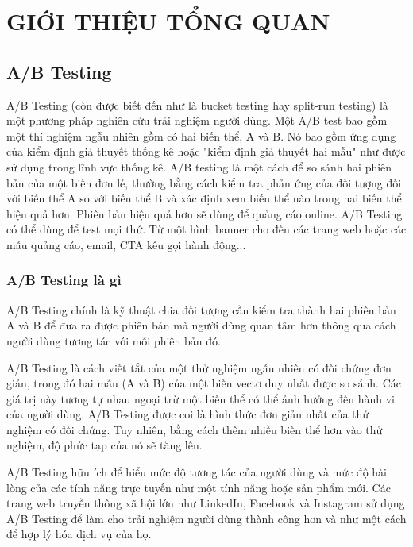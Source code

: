 \chapter{GIỚI THIỆU TỔNG QUAN}


\section{A/B Testing}

A/B Testing (còn được biết đến như là bucket testing hay split-run testing) là một phương pháp nghiên cứu trải nghiệm người dùng. Một A/B test bao gồm một thí nghiệm ngẫu nhiên gồm có hai biến thể, A và B. Nó bao gồm ứng dụng của kiểm định giả thuyết thống kê hoặc "kiểm định giả thuyết hai mẫu" như được sử dụng trong lĩnh vực thống kê. A/B testing là một cách để so sánh hai phiên bản của một biến đơn lẻ, thường bằng cách kiểm tra phản ứng của đối tượng đối với biến thể A so với biến thể B và xác định xem biến thể nào trong hai biến thể hiệu quả hơn. Phiên bản hiệu quả hơn sẽ dùng để quảng cáo online. A/B Testing có thể dùng để test mọi thứ. Từ một hình banner cho đến các trang web hoặc các mẫu quảng cáo, email, CTA kêu gọi hành động...

\subsection{A/B Testing là gì}

A/B Testing chính là kỹ thuật chia đối tượng cần kiểm tra thành hai phiên bản A và B để đưa ra được phiên bản mà người dùng quan tâm hơn thông qua cách người dùng tương tác với mỗi phiên bản đó.

A/B Testing là cách viết tắt của một thử nghiệm ngẫu nhiên có đối chứng đơn giản, trong đó hai mẫu (A và B) của một biến vectơ duy nhất được so sánh. Các giá trị này tương tự nhau ngoại trừ một biến thể có thể ảnh hưởng đến hành vi của người dùng. A/B Testing được coi là hình thức đơn giản nhất của thử nghiệm có đối chứng. Tuy nhiên, bằng cách thêm nhiều biến thể hơn vào thử nghiệm, độ phức tạp của nó sẽ tăng lên.

A/B Testing hữu ích để hiểu mức độ tương tác của người dùng và mức độ hài lòng của các tính năng trực tuyến như một tính năng hoặc sản phẩm mới. Các trang web truyền thông xã hội lớn như LinkedIn, Facebook và Instagram sử dụng A/B Testing để làm cho trải nghiệm người dùng thành công hơn và như một cách để hợp lý hóa dịch vụ của họ.

